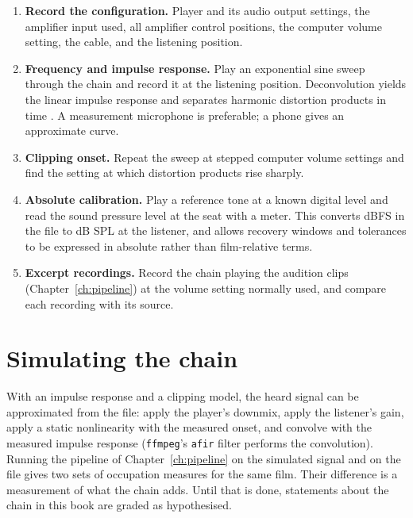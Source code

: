 \begin{enumerate}
\item \textbf{Record the configuration.} Player and its audio output settings, the amplifier input used, all amplifier control positions, the computer volume setting, the cable, and the listening position.
\item \textbf{Frequency and impulse response.} Play an exponential sine sweep through the chain and record it at the listening position. Deconvolution yields the linear impulse response and separates harmonic distortion products in time \citep{farina2000}. A measurement microphone is preferable; a phone gives an approximate curve.
\item \textbf{Clipping onset.} Repeat the sweep at stepped computer volume settings and find the setting at which distortion products rise sharply.
\item \textbf{Absolute calibration.} Play a reference tone at a known digital level and read the sound pressure level at the seat with a meter. This converts dBFS in the file to dB SPL at the listener, and allows recovery windows and tolerances to be expressed in absolute rather than film-relative terms.
\item \textbf{Excerpt recordings.} Record the chain playing the audition clips (Chapter~\ref{ch:pipeline}) at the volume setting normally used, and compare each recording with its source.
\end{enumerate}

\section{Simulating the chain}

With an impulse response and a clipping model, the heard signal can be approximated from the file: apply the player's downmix, apply the listener's gain, apply a static nonlinearity with the measured onset, and convolve with the measured impulse response (\texttt{ffmpeg}'s \texttt{afir} filter performs the convolution). Running the pipeline of Chapter~\ref{ch:pipeline} on the simulated signal and on the file gives two sets of occupation measures for the same film. Their difference is a measurement of what the chain adds. Until that is done, statements about the chain in this book are graded as hypothesised.
